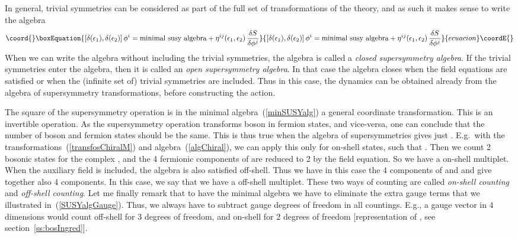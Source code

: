 \documentclass[a4paper,11pt,twoside]{article}
\providecommand{\Red}[1]{#1}
\providecommand{\OliveGreen}[1]{#1}
\providecommand{\Blue}[1]{#1}
\providecommand{\SO}{\mathop{\rm SO}}
\begin{document}
In general, trivial symmetries can be considered as part of the full set
of transformations of the theory, and as such it makes sense to write the
algebra
\begin{equation}\coord{}\boxEquation{
  \left[ \delta (\OliveGreen{\epsilon _1}),\delta (\OliveGreen{\epsilon _2})\right] \Blue{\phi^i}
=\mbox{minimal susy algebra}+\Red{\eta ^{ij}}(\OliveGreen{\epsilon
_1,\epsilon _2})\,\frac{\delta S}{\delta \Blue{\phi ^j}}
 \label{algWithTriv}
}{
  \left[ \delta (\OliveGreen{\epsilon _1}),\delta (\OliveGreen{\epsilon _2})\right] \Blue{\phi^i}
=\mbox{minimal susy algebra}+\Red{\eta ^{ij}}(\OliveGreen{\epsilon
_1,\epsilon _2})\,\frac{\delta S}{\delta \Blue{\phi ^j}}
 }{ecuacion}\coordE{}\end{equation}
When we can write the algebra without including the trivial symmetries,
the algebra is called a \emph{closed supersymmetry algebra}. If the
trivial symmetries enter the algebra, then it is called an \emph{open
supersymmetry algebra}. In that case the algebra closes when the field
equations are satisfied or when the (infinite set of) trivial symmetries
are included. Thus in this case, the dynamics can be obtained already
from the algebra of supersymmetry transformations, before constructing
the action.

The square of the supersymmetry operation is in the minimal
algebra~(\ref{minSUSYalg}) a general coordinate transformation. This is
an invertible operation. As the supersymmetry operation transforms boson
in fermion states, and vice-versa, one can conclude that the number of
boson and fermion states should be the same. This is thus true when the
algebra of supersymmetries gives just \myHighlight{$\OliveGreen{P}$}\coordHE{}. E.g.\ with the
transformations~(\ref{transfosChiralM}) and algebra~(\ref{algChiral}), we
can apply this only for on-shell states, such that \myHighlight{$\slashed\partial
\Blue{\chi }=0$}\coordHE{}. Then we count 2 bosonic states for the complex
\myHighlight{$\Blue{z}$}\coordHE{}, and the 4 fermionic components of \myHighlight{$\Blue{\chi }$}\coordHE{} are reduced
to 2 by the field equation. So we have a \coordHE{} on-shell multiplet. When
the auxiliary field \myHighlight{$\Red{h}$}\coordHE{} is included, the algebra is also satisfied
off-shell. Thus we have in this case the 4 components of \myHighlight{$\Blue{\chi }$}\coordHE{}
and \myHighlight{$\Blue{z}$}\coordHE{} and \myHighlight{$\Red{h}$}\coordHE{} give together also 4 components. In this
case, we say that we have a \coordHE{} off-shell multiplet. These two ways of
counting are called \emph{on-shell counting} and \emph{off-shell
counting}. Let me finally remark that to have the minimal algebra we have
to eliminate the extra gauge terms that we illustrated
in~(\ref{SUSYalgGauge}). Thus, we always have to subtract gauge degrees
of freedom in all countings. E.g., a gauge vector in 4 dimensions would
count off-shell for 3 degrees of freedom, and on-shell for 2 degrees of
freedom [representation of \myHighlight{$\SO(D-2)$}\coordHE{}, see section~\ref{ss:bosIngred}].
\end{document}
